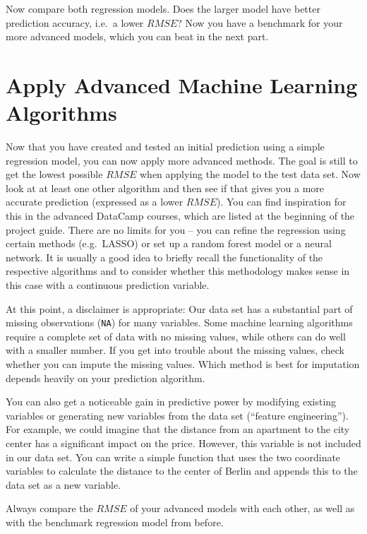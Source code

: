 \documentclass[
  11pt,
]{book}
\begin{document}
Now compare both regression models. Does the larger model have better prediction accuracy, i.e.~a lower \(RMSE\)? Now you have a benchmark for your more advanced models, which you can beat in the next part.

\hypertarget{apply-advanced-machine-learning-algorithms}{%
\section{Apply Advanced Machine Learning Algorithms}\label{apply-advanced-machine-learning-algorithms}}

Now that you have created and tested an initial prediction using a simple regression model, you can now apply more advanced methods. The goal is still to get the lowest possible \(RMSE\) when applying the model to the test data set. Now look at at least one other algorithm and then see if that gives you a more accurate prediction (expressed as a lower \(RMSE\)). You can find inspiration for this in the advanced DataCamp courses, which are listed at the beginning of the project guide. There are no limits for you -- you can refine the regression using certain methods (e.g.~LASSO) or set up a random forest model or a neural network. It is usually a good idea to briefly recall the functionality of the respective algorithms and to consider whether this methodology makes sense in this case with a continuous prediction variable.

At this point, a disclaimer is appropriate: Our data set has a substantial part of missing observations (\texttt{NA}) for many variables. Some machine learning algorithms require a complete set of data with no missing values, while others can do well with a smaller number. If you get into trouble about the missing values, check whether you can impute the missing values. Which method is best for imputation depends heavily on your prediction algorithm.

You can also get a noticeable gain in predictive power by modifying existing variables or generating new variables from the data set (``feature engineering''). For example, we could imagine that the distance from an apartment to the city center has a significant impact on the price. However, this variable is not
included in our data set. You can write a simple function that uses the two coordinate variables to calculate the distance to the center of Berlin and appends this to the data set as a new variable.

Always compare the \(RMSE\) of your advanced models with each other, as well as with the benchmark regression model from before.
\end{document}
